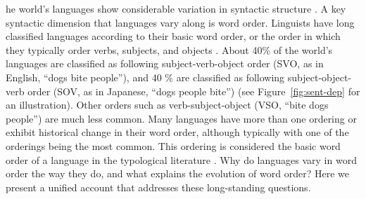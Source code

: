 \documentclass[9pt,twocolumn,twoside,lineno]{pnas-new}
\begin{document}


he world's languages show considerable variation in syntactic structure \citep{greenberg-universals-1963, baker2001atoms, croft2003typology}. A key syntactic dimension that languages vary along is word order. Linguists have long classified languages according to their basic word order, or the order in which they typically order verbs, subjects, and objects \citep{greenberg-universals-1963}.
About 40\% of the world's languages are classified as following subject-verb-object order ({SVO}, as in English, ``dogs bite people''), and 40 \% are classified as following subject-object-verb order ({SOV}, as in Japanese, ``dogs people bite'') \citep{wals-81} (see Figure~\ref{fig:sent-dep} for an illustration). Other orders such as verb-subject-object (VSO, ``bite dogs people'') are much less common. Many languages have more than one ordering or exhibit historical change in their word order, although typically with one of the orderings being the most common. This ordering is considered the basic word order of a language in the typological literature \citep{greenberg-universals-1963, wals-s6}. Why do languages vary in word order the way they do, and what explains the evolution of word order? Here we present a unified account that addresses these long-standing questions.
\end{document}
